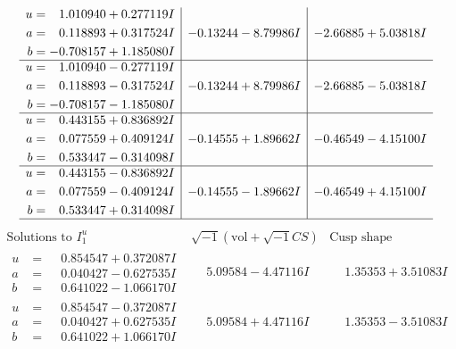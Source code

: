 \documentclass[1p]{elsarticle_modified}
\theoremstyle{definition}
\newcommand{\I}{\sqrt{-1}}
\begin{document}
$$\begin{array}{c|c|c}
\begin{aligned}
u &= \phantom{-}1.010940 + 0.277119 I \\
a &= \phantom{-}0.118893 + 0.317524 I \\
b &= -0.708157 + 1.185080 I\end{aligned}
 & -0.13244 - 8.79986 I & -2.66885 + 5.03818 I \\ \hline\begin{aligned}
u &= \phantom{-}1.010940 - 0.277119 I \\
a &= \phantom{-}0.118893 - 0.317524 I \\
b &= -0.708157 - 1.185080 I\end{aligned}
 & -0.13244 + 8.79986 I & -2.66885 - 5.03818 I \\ \hline\begin{aligned}
u &= \phantom{-}0.443155 + 0.836892 I \\
a &= \phantom{-}0.077559 + 0.409124 I \\
b &= \phantom{-}0.533447 - 0.314098 I\end{aligned}
 & -0.14555 + 1.89662 I & -0.46549 - 4.15100 I \\ \hline\begin{aligned}
u &= \phantom{-}0.443155 - 0.836892 I \\
a &= \phantom{-}0.077559 - 0.409124 I \\
b &= \phantom{-}0.533447 + 0.314098 I\end{aligned}
 & -0.14555 - 1.89662 I & -0.46549 + 4.15100 I\\
 \hline 
 \end{array}$$\newpage$$\begin{array}{c|c|c}  
\text{Solutions to }I^u_{1}& \I (\text{vol} + \sqrt{-1}CS) & \text{Cusp shape}\\
 \hline 
\begin{aligned}
u &= \phantom{-}0.854547 + 0.372087 I \\
a &= \phantom{-}0.040427 - 0.627535 I \\
b &= \phantom{-}0.641022 - 1.066170 I\end{aligned}
 & \phantom{-}5.09584 - 4.47116 I & \phantom{-}1.35353 + 3.51083 I \\ \hline\begin{aligned}
u &= \phantom{-}0.854547 - 0.372087 I \\
a &= \phantom{-}0.040427 + 0.627535 I \\
b &= \phantom{-}0.641022 + 1.066170 I\end{aligned}
 & \phantom{-}5.09584 + 4.47116 I & \phantom{-}1.35353 - 3.51083 I \\ \hline\begin{aligned}

\end{aligned}
\end{array}$$
\end{document}
